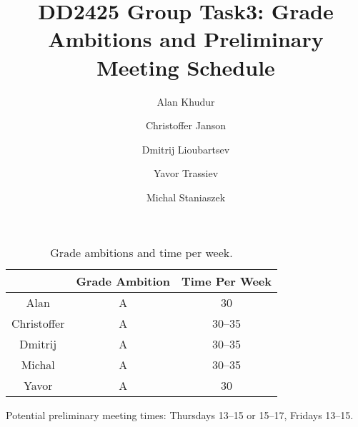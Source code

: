\documentclass[10pt,a4paper]{article}
\author{Alan Khudur \and Christoffer Janson \and Dmitrij Lioubartsev \and Yavor
  Trassiev \and Michal Staniaszek}
\title{DD2425 Group Task3: Grade Ambitions and Preliminary Meeting Schedule}
\begin{document}
\maketitle

\begin{table}[!h]
  \centering
  \begin{tabular}{|c|c|c|}
    \hline
    &Grade Ambition & Time Per Week\\ \hline
    Alan & A & 30\\
    Christoffer & A & 30--35\\
    Dmitrij & A & 30--35 \\
    Michal & A & 30--35 \\
    Yavor & A & 30 \\\hline
  \end{tabular}
  \caption{Grade ambitions and time per week.}
\end{table}

Potential preliminary meeting times: Thursdays 13--15 or 15--17, Fridays 13--15.
\end{document}
